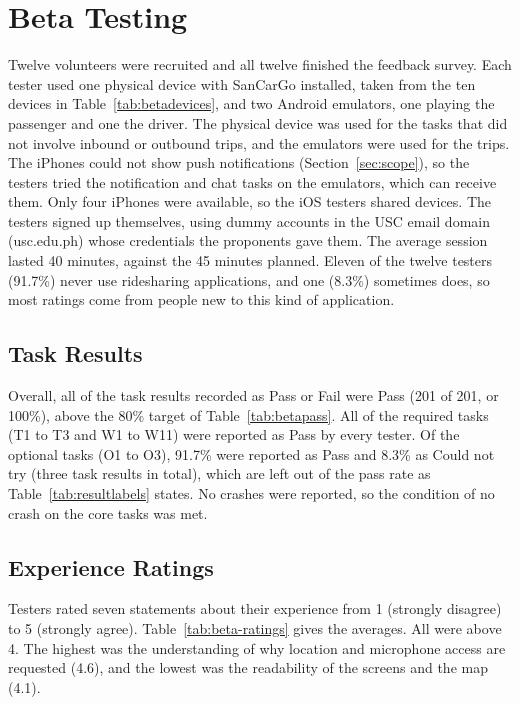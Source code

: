 \section{Beta Testing}
\label{sec:beta-results}
Twelve volunteers were recruited and all twelve finished the feedback survey. Each tester used one physical device with SanCarGo installed, taken from the ten devices in Table~\ref{tab:betadevices}, and two Android emulators, one playing the passenger and one the driver. The physical device was used for the tasks that did not involve inbound or outbound trips, and the emulators were used for the trips. The iPhones could not show push notifications (Section~\ref{sec:scope}), so the testers tried the notification and chat tasks on the emulators, which can receive them. Only four iPhones were available, so the iOS testers shared devices. The testers signed up themselves, using dummy accounts in the USC email domain (usc.edu.ph) whose credentials the proponents gave them. The average session lasted 40 minutes, against the 45 minutes planned. Eleven of the twelve testers (91.7\%) never use ridesharing applications, and one (8.3\%) sometimes does, so most ratings come from people new to this kind of application.

\subsection{Task Results}
Overall, all of the task results recorded as Pass or Fail were Pass (201 of 201, or 100\%), above the 80\% target of Table~\ref{tab:betapass}. All of the required tasks (T1 to T3 and W1 to W11) were reported as Pass by every tester. Of the optional tasks (O1 to O3), 91.7\% were reported as Pass and 8.3\% as Could not try (three task results in total), which are left out of the pass rate as Table~\ref{tab:resultlabels} states. No crashes were reported, so the condition of no crash on the core tasks was met.

\subsection{Experience Ratings}
Testers rated seven statements about their experience from 1 (strongly disagree) to 5 (strongly agree). Table~\ref{tab:beta-ratings} gives the averages. All were above 4. The highest was the understanding of why location and microphone access are requested (4.6), and the lowest was the readability of the screens and the map (4.1).

